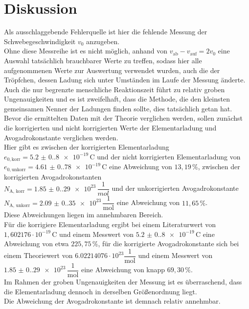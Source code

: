 \section{Diskussion}

Als ausschlaggebende Fehlerquelle ist hier die fehlende Messung der Schwebegeschwindigkeit $v_0$ anzugeben.\\
Ohne diese Messreihe ist es nicht möglich, anhand von $v_\text{ab} - v_\text{auf} = 2 v_0$ eine Auswahl tatsächlich brauchbarer Werte zu treffen, sodass hier alle aufgenommenen Werte zur Auswertung verwendet wurden,
auch die der Tröpfchen, dessen Ladung sich unter Umständen im Laufe der Messung änderte. \\
Auch die nur begrenzte menschliche Reaktionszeit führt zu relativ groben Ungenauigkeiten und es ist zweifelhaft, dass die Methode, die den kleinsten gemeinsamen Nenner der Ladungen finden sollte, dies
tatsächlich getan hat. \\

Bevor die ermittelten Daten mit der Theorie verglichen werden, sollen zunächst die korrigierten und nicht korrigierten
Werte der Elementarladung und Avogadrokonstante verglichen werden. \\
Hier gibt es zwischen der korrigierten Elementarladung $e_{0,\text{korr}} = \qty{5.2(0.8)e-19} \,\unit{\coulomb}$
und der nicht korrigierten Elementarladung von $e_{0, \text{unkorr}} = \qty{4.61(0.78)e-19} \,\si{\coulomb}$ eine
Abweichung von $13,19 \,\%$, zwischen der korrigierten Avogadrokonstanten \\ $N_\text{A, korr} = \qty{1.85(0.29)e23} \, \dfrac{1}{\si{mol}}$
und der unkorrigierten Avogadrokonstante \\ $N_\text{A, unkorr} = \qty{2.09(0.35)e+23} \,\dfrac{1}{\si{\mol}}$ eine Abweichung
von $11,65 \,\%$. \\
Diese Abweichungen liegen im annehmbaren Bereich. \\

Für die korrigiere Elementarladung ergibt bei einem Literaturwert von $1,602176 \cdot 10^{-19} \,\si{\coulomb}$ \cite{elchar} und einem
Messwert von $\qty{5.2(0.8)e-19} \,\si{\coulomb}$ eine Abweichung von etwa $225,75 \,\%$, für die korrigierte Avogadrokonstante sich bei einem Theoriewert von $6.02214076 \cdot 10^{23} \dfrac{1}{\si{\mol}}$ \cite{na} und einem Messwert von $\qty{1.85(0.29)e23} \,\dfrac{1}{\si{\mol}}$ eine Abweichung von knapp
$69,30 \,\%$. \\

Im Rahmen der groben Ungenauigkeiten der Messung ist es überraschend, dass die Elementarladung dennoch in derselben Größenordnung liegt. \\
Die Abweichung der Avogadrokonstante ist demnach relativ annehmbar.
